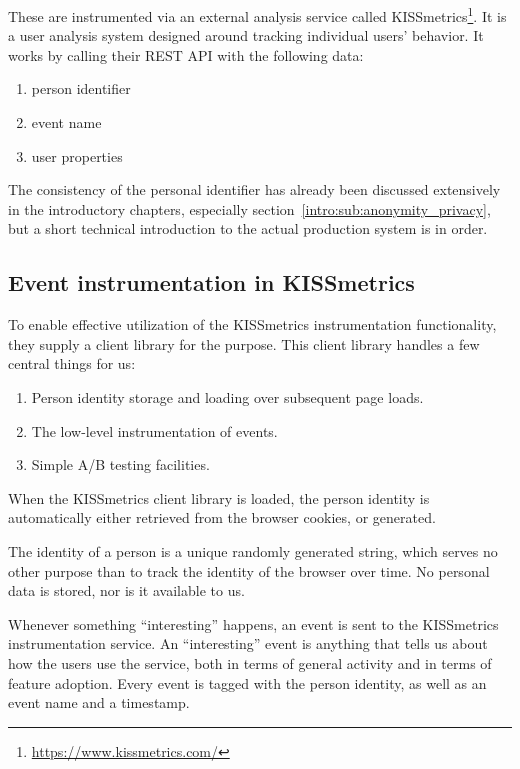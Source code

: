 These are instrumented via an external analysis service called KISSmetrics\footnote{\url{https://www.kissmetrics.com/}}. It is a user analysis system designed around tracking individual users' behavior. It works by calling their REST API with the following data:

\begin{enumerate}
  \item person identifier
  \item event name
  \item user properties
\end{enumerate}

The consistency of the personal identifier has already been discussed extensively in the introductory chapters, especially section~\ref{intro:sub:anonymity_privacy}, but a short technical introduction to the actual production system is in order.

\subsection{Event instrumentation in KISSmetrics}
\label{approach:sec:event_instrumentation}

To enable effective utilization of the KISSmetrics instrumentation functionality, they supply a client library for the purpose. This client library handles a few central things for us:

\begin{enumerate}
  \item Person identity storage and loading over subsequent page loads.
  \item The low-level instrumentation of events.
  \item Simple A/B testing facilities.
\end{enumerate}

When the KISSmetrics client library is loaded, the person identity is automatically either retrieved from the browser cookies, or generated.

The identity of a person is a unique randomly generated string, which serves no other purpose than to track the identity of the browser over time. No personal data is stored, nor is it available to us.

Whenever something ``interesting'' happens, an event is sent to the KISSmetrics instrumentation service. An ``interesting'' event is anything that tells us about how the users use the service, both in terms of general activity and in terms of feature adoption. Every event is tagged with the person identity, as well as an event name and a timestamp.

